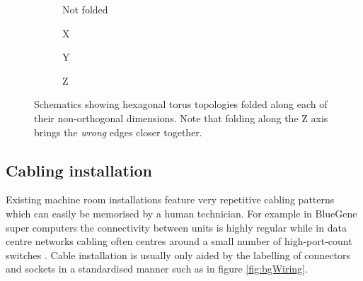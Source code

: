 			\begin{figure}
				\center
				\begin{subfigure}[b]{0.24\linewidth}
					\center
					\caption{Not folded}
					\label{fig:failing-to-fold-hex-toruses-none}
				\end{subfigure}
				\begin{subfigure}[b]{0.24\linewidth}
					\center
					\caption{X}
					\label{fig:failing-to-fold-hex-toruses-x}
				\end{subfigure}
				\begin{subfigure}[b]{0.24\linewidth}
					\center
					\caption{Y}
					\label{fig:failing-to-fold-hex-toruses-y}
				\end{subfigure}
				\begin{subfigure}[b]{0.24\linewidth}
					\center
					\caption{Z}
					\label{fig:failing-to-fold-hex-toruses-z}
				\end{subfigure}
				
				\caption{Schematics showing hexagonal torus topologies folded along
				each of their non-orthogonal dimensions. Note that folding along
				the Z axis brings the \emph{wrong} edges closer together.}
				\label{fig:failing-to-fold-hex-toruses}
			\end{figure}
		
		\subsection{Cabling installation}
			
			Existing machine room installations feature very repetitive cabling
			patterns which can easily be memorised by a human technician. For example
			in BlueGene super computers the connectivity between units is highly
			regular \cite{lakner07} while in data centre networks cabling often
			centres around a small number of high-port-count switches
			\cite{cisco07,csernai15}. Cable installation is usually only aided by
			the labelling of connectors and sockets in a standardised manner
			\cite{tia2006} such as in figure \ref{fig:bgWiring}.
			
